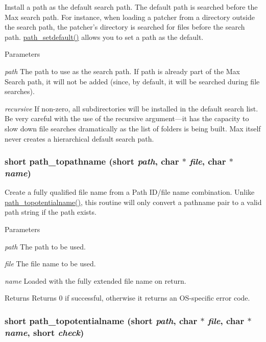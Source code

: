 Install a path as the default search path. The default path is searched before the Max search path. For instance, when loading a patcher from a directory outside the search path, the patcher’s directory is searched for files before the search path. \hyperlink{group__files_ga57ecd9b35a253cc980f911c7f7c1854b}{path\_\-setdefault()} allows you to set a path as the default.


\begin{DoxyParams}{Parameters}
\item[{\em path}]The path to use as the search path. If path is already part of the Max Search path, it will not be added (since, by default, it will be searched during file searches). \item[{\em recursive}]If non-\/zero, all subdirectories will be installed in the default search list. Be very careful with the use of the recursive argument—it has the capacity to slow down file searches dramatically as the list of folders is being built. Max itself never creates a hierarchical default search path. \end{DoxyParams}
\hypertarget{group__files_gacfce0e7df61bc36f82c61ff2bbf73ffb}{
\subsubsection[{path\_\-topathname}]{\setlength{\rightskip}{0pt plus 5cm}short path\_\-topathname (short {\em path}, \/  char $\ast$ {\em file}, \/  char $\ast$ {\em name})}}
\label{group__files_gacfce0e7df61bc36f82c61ff2bbf73ffb}


Create a fully qualified file name from a Path ID/file name combination. Unlike \hyperlink{group__files_ga80ffef5b7e9ac12ef33dd048a0607133}{path\_\-topotentialname()}, this routine will only convert a pathname pair to a valid path string if the path exists.


\begin{DoxyParams}{Parameters}
\item[{\em path}]The path to be used. \item[{\em file}]The file name to be used. \item[{\em name}]Loaded with the fully extended file name on return. \end{DoxyParams}
\begin{DoxyReturn}{Returns}
Returns 0 if successful, otherwise it returns an OS-\/specific error code. 
\end{DoxyReturn}
\hypertarget{group__files_ga80ffef5b7e9ac12ef33dd048a0607133}{
\subsubsection[{path\_\-topotentialname}]{\setlength{\rightskip}{0pt plus 5cm}short path\_\-topotentialname (short {\em path}, \/  char $\ast$ {\em file}, \/  char $\ast$ {\em name}, \/  short {\em check})}}
\label{group__files_ga80ffef5b7e9ac12ef33dd048a0607133}


